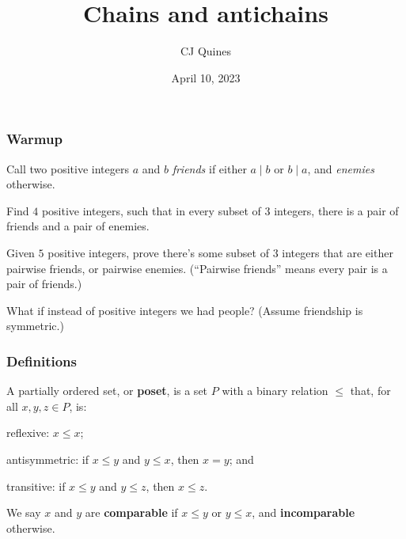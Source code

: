 \documentclass[11pt,paper=letter]{scrartcl}
\begin{document}
\title{Chains and antichains}
\author{CJ Quines}
\date{April 10, 2023}

\maketitle

\subsubsection*{Warmup}

Call two positive integers $a$ and $b$ \textit{friends} if either $a \mid b$ or $b \mid a$, and \textit{enemies} otherwise.
\begin{enumthin}
\item Find $4$ positive integers, such that in every subset of $3$ integers, there is a pair of friends and a pair of enemies.
\item Given $5$ positive integers, prove there's some subset of $3$ integers that are either pairwise friends, or pairwise enemies. (``Pairwise friends'' means every pair is a pair of friends.)
\item What if instead of positive integers we had people? (Assume friendship is symmetric.)
\end{enumthin}

\subsubsection*{Definitions}

A partially ordered set, or \textbf{poset}, is a set $P$ with a binary relation $\le$ that, for all $x, y, z \in P$, is:
\begin{itemthin}
\item reflexive: $x \le x$;
\item antisymmetric: if $x \le y$ and $y \le x$, then $x = y$; and
\item transitive: if $x \le y$ and $y \le z$, then $x \le z$.
\end{itemthin}
We say $x$ and $y$ are \textbf{comparable} if $x \le y$ or $y \le x$, and \textbf{incomparable} otherwise.
\end{document}
